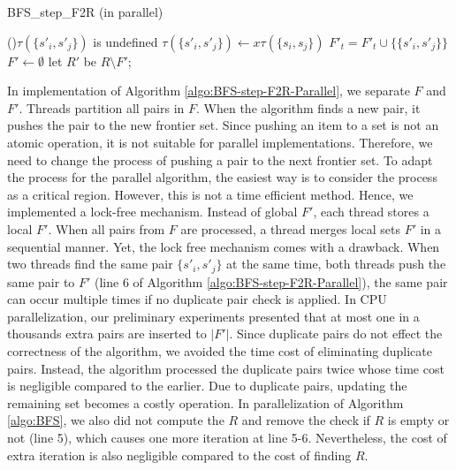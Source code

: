\documentclass[12pt]{article}
\begin{document}
\begin{algorithm}[ht]
	\caption{BFS\_step\_F2R (in parallel)}
	\label{algo:BFS-step-F2R-Parallel}
	
	
	{
		{
			{
				\If(){$\tau({\{ s'_i,s'_j \}})$ is undefined}
				{
					$\tau(\{ s'_i,s'_j\}) \longleftarrow x \tau(\{ s_i,s_j \})$\;
					$F'_t = F'_t \cup \{ \{ s'_i,s'_j \}  \} $\;
				}
			}
		}
	}
	$F' \longleftarrow \emptyset$\;
	let $R'$ be $R \setminus F'$;
\end{algorithm}

In implementation of Algorithm \ref{algo:BFS-step-F2R-Parallel}, we separate $F$ and $F'$. Threads partition all pairs in $F$. When the algorithm finds a new pair, it pushes the pair to the new frontier set. Since pushing an item to a set is not an atomic operation, it is not suitable for parallel implementations. Therefore, we need to change the process of pushing a pair to the next frontier set. To adapt the process for the parallel algorithm, the easiest way is to consider the process as a critical region. However, this is not a time efficient method. Hence, we implemented a lock-free mechanism. Instead of global $F'$, each thread stores a local $F'$. When all pairs from $F$ are processed, a thread merges local sets $F'$ in a sequential manner. Yet, the lock free mechanism comes with a drawback. When two threads find the same pair $\{ s'_i,s'_j\}$ at the same time, both threads push the same pair to $F'$ (line 6 of Algorithm \ref{algo:BFS-step-F2R-Parallel}), the same pair can occur multiple times if no duplicate pair check is applied. In CPU parallelization, our preliminary experiments presented that at most one in a thousands extra pairs are inserted to $|F'|$. Since duplicate pairs do not effect the correctness of the algorithm, we avoided the time cost of eliminating duplicate pairs. Instead, the algorithm processed the duplicate pairs twice whose time cost is negligible compared to the earlier. Due to duplicate pairs, updating the remaining set becomes a costly operation. In parallelization of Algorithm \ref{algo:BFS}, we also did not compute the $R$ and remove the check if $R$ is empty  or not (line 5), which causes one more iteration at line 5-6. Nevertheless, the cost of extra iteration is also negligible compared to the cost of finding $R$.
\end{document}
